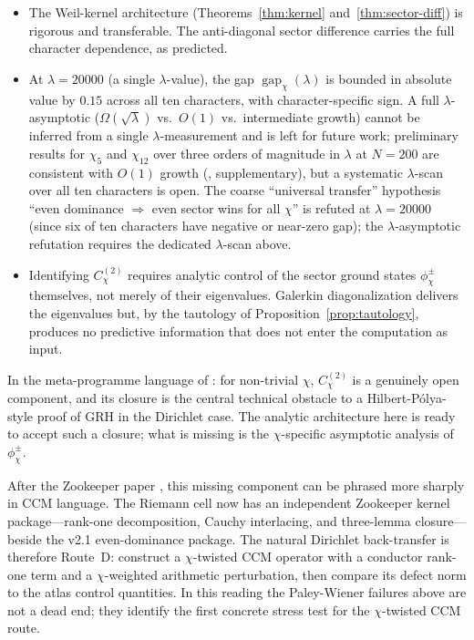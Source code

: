 \documentclass[10pt,twocolumn]{article}
\theoremstyle{definition}
\theoremstyle{remark}
\newcommand{\gap}{\operatorname{gap}}
\newcommand{\chifn}{\chi}
\begin{document}
\begin{itemize}
  \item[(I1)] The Weil-kernel architecture (Theorems~\ref{thm:kernel}
    and~\ref{thm:sector-diff}) is rigorous and transferable. The
    anti-diagonal sector difference carries the full character
    dependence, as predicted.
  \item[(I2)] At $\lambda=20000$ (a single $\lambda$-value), the gap
    $\gap_{\chifn}(\lambda)$ is bounded in absolute value by
    $0.15$ across all ten characters, with character-specific sign.
    A full $\lambda$-asymptotic ($\Omega(\sqrt{\lambda})$ vs.\
    $O(1)$ vs.\ intermediate growth) cannot be inferred from a
    single $\lambda$-measurement and is left for future work;
    preliminary results for $\chifn_5$ and $\chifn_{12}$ over three
    orders of magnitude in $\lambda$ at $N=200$ are consistent
    with $O(1)$ growth (\cite{AsymptoticScan}, supplementary), but
    a systematic $\lambda$-scan over all ten characters is open.
    The coarse ``universal transfer'' hypothesis ``even dominance
    $\Rightarrow$ even sector wins for all $\chifn$'' is refuted
    at $\lambda=20000$ (since six of ten characters have negative
    or near-zero gap); the $\lambda$-asymptotic refutation requires
    the dedicated $\lambda$-scan above.
  \item[(I3)] Identifying $C^{(2)}_{\chifn}$ requires analytic
    control of the sector ground states $\phi^\pm_{\chifn}$
    themselves, not merely of their eigenvalues. Galerkin
    diagonalization delivers the eigenvalues but, by the tautology
    of Proposition~\ref{prop:tautology}, produces no predictive
    information that does not enter the computation as input.
\end{itemize}

In the meta-programme language of \cite{MetaGalerkinBridge}: for
non-trivial $\chifn$, $C^{(2)}_{\chifn}$ is a genuinely open
component, and its closure is the central technical obstacle to a
Hilbert-P\'olya-style proof of GRH in the Dirichlet case. The
analytic architecture here is ready to accept such a closure; what
is missing is the $\chifn$-specific asymptotic analysis of
$\phi^\pm_{\chifn}$.

After the Zookeeper paper \cite{Zookeeper2026}, this missing
component can be phrased more sharply in CCM language. The Riemann
cell now has an independent Zookeeper kernel package---rank-one
decomposition, Cauchy interlacing, and three-lemma closure---beside
the v2.1 even-dominance package. The natural Dirichlet back-transfer
is therefore Route~D: construct a $\chifn$-twisted CCM operator with
a conductor rank-one term and a $\chifn$-weighted arithmetic
perturbation, then compare its defect norm to the atlas control
quantities. In this reading the Paley-Wiener failures above are not a
dead end; they identify the first concrete stress test for the
$\chifn$-twisted CCM route.
\end{document}
